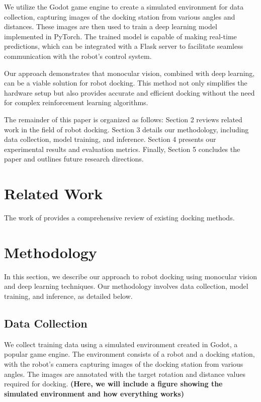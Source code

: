 \documentclass{article}
\begin{document}
We utilize the Godot game engine to create a simulated environment for data collection, capturing images of the docking station from various angles and distances. These images are then used to train a deep learning model implemented in PyTorch. The trained model is capable of making real-time predictions, which can be integrated with a Flask server to facilitate seamless communication with the robot's control system.

Our approach demonstrates that monocular vision, combined with deep learning, can be a viable solution for robot docking. This method not only simplifies the hardware setup but also provides accurate and efficient docking without the need for complex reinforcement learning algorithms.

The remainder of this paper is organized as follows: Section 2 reviews related work in the field of robot docking. Section 3 details our methodology, including data collection, model training, and inference. Section 4 presents our experimental results and evaluation metrics. Finally, Section 5 concludes the paper and outlines future research directions.

\section{Related Work}
The work of \citet{app131910675} provides a comprehensive review of existing docking methods.

\section{Methodology}
In this section, we describe our approach to robot docking using monocular vision and deep learning techniques. Our methodology involves data collection, model training, and inference, as detailed below.

\subsection{Data Collection}
We collect training data using a simulated environment created in Godot, a popular game engine. The environment consists of a robot and a docking station, with the robot's camera capturing images of the docking station from various angles. The images are annotated with the target rotation and distance values required for docking.
\textbf{(Here, we will include a figure showing the simulated environment and how everything works)}
\end{document}
